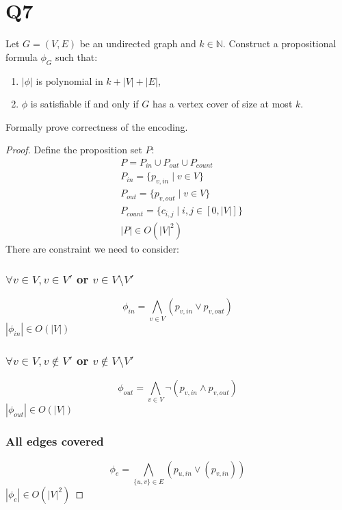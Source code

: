 \documentclass{article}
\begin{document}
\section*{Q7}
Let $G=(V,E)$ be an undirected graph and $k\in\mathbb{N}$.
Construct a propositional formula $\phi_G$ such that:
\begin{enumerate}
  \item $|\phi|$ is polynomial in $k+|V|+|E|$,
  \item $\phi$ is satisfiable if and only if $G$ has a vertex cover of size at most $k$.
\end{enumerate}
Formally prove correctness of the encoding.
\begin{proof}
Define the proposition set $P:$
\begin{align*}
    &P = P_{in} \cup P_{out} \cup P_{count}\\
    &P_{in} = \{p_{v, in} \mid v \in V\}\\
    &P_{out} = \{p_{v, out} \mid v \in V\}\\
    &P_{count} = \{c_{i, j} \mid i,j \in [0, |V|]\}\\
    &|P| \in O(|V|^2)
\end{align*}
There are constraint we need to consider: 
\subsubsection*{$\forall v \in V, v \in V'$ or $v \in V\setminus V'$}
\[\phi_{in} = \bigwedge_{v\in V} (p_{v, in} \lor p_{v, out})\]
$|\phi_{in}| \in O(|V|)$
\subsubsection*{$\forall v \in V, v \notin V'$ or $v \notin V\setminus V'$}
\[\phi_{out} = \bigwedge_{v\in V} \neg(p_{v, in}\land p_{v, out})\]
$|\phi_{out}| \in O(|V|)$
\subsubsection*{All edges covered}
\[\phi_e = \bigwedge_{\{u, v\} \in E} (p_{u, in} \lor (p_{v, in}))\]
$|\phi_{e}| \in O(|V|^2)$

\end{proof}
\end{document}
